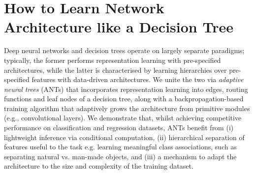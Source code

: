 %
%
\chapter{How to Learn Network Architecture like a Decision Tree}
\label{chapter:ant}
Deep neural networks and decision trees operate on largely separate paradigms; typically, the former performs representation learning with pre-specified architectures, while the latter is characterised by learning hierarchies over pre-specified features with data-driven architectures. We unite the two via \emph{adaptive neural trees} (ANTs) that incorporates representation learning into edges, routing functions and leaf nodes of a decision tree, along with a backpropagation-based training algorithm that adaptively grows the architecture from primitive modules (e.g., convolutional layers). We demonstrate that, whilst achieving competitive performance on classification and regression datasets, ANTs benefit from (i) lightweight inference via conditional computation, (ii) hierarchical separation of features useful to the task e.g. learning meaningful class associations, such as separating natural vs. man-made objects, and (iii) a mechanism to adapt the architecture to the size and complexity of the training dataset.

%





%

%
%

% 